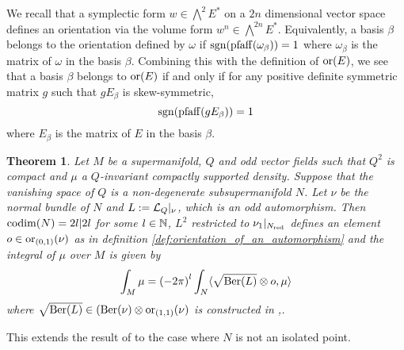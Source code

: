 \documentclass[11pt]{amsart}
\numberwithin{equation}{section}
\numberwithin{figure}{section}
\theoremstyle{plain}
\newtheorem{thm}{Theorem}[subsection]
\theoremstyle{definition}
\theoremstyle{remark}
\begin{document}
We recall that a symplectic form $w\in\bigwedge^{2}E^{*}$ on a $2n$
dimensional vector space defines an orientation via the volume form
$w^{n}\in\bigwedge^{2n}E^{*}$. Equivalently, a basis $\beta$ belongs
to the orientation defined by $\omega$ if $\mathrm{sgn}(\mathrm{pfaff}(\omega_{\beta}))=1$
where $\omega_{\beta}$ is the matrix of $\omega$ in the basis $\beta$.
Combining this with the definition of $\mathrm{or}(E)$, we see that a basis
$\beta$ belongs to $\mathrm{or}(E)$ if and only if for any positive definite
symmetric matrix $g$ such that $gE_{\beta}$ is skew-symmetric, 
\[
\mathrm{sgn}(\mathrm{pfaff}(gE_{\beta}))=1
\]
where $E_{\beta}$ is the matrix of $E$ in the basis $\beta$.
\begin{thm}
\label{thm:localization_formula} Let $M$ be a supermanifold, $Q$
and odd vector fields such that $Q^{2}$ is compact and $\mu$ a $Q$-invariant
compactly supported density. Suppose that the vanishing space of $Q$
is a non-degenerate subsupermanifold $N$. Let $\nu$ be the normal
bundle of $N$ and $L:=\mathcal{L}_{Q}|_{\nu}$, which is an odd automorphism.
Then ${\rm codim}(N)=2l|2l$ for some $l\in\mathbb{N}$, $L^{2}$ restricted
to $\nu_{1}|_{N_{\mathrm{red}}}$ defines an element $o\in\mathrm{or}_{(0,1)}(\nu)$
as in definition \ref{def:orientation_of_an_automorphism} and the
integral of $\mu$ over $M$ is given by 
\[
\int_{M}\mu=\left(-2\pi\right)^{l}\int_{N}\langle\sqrt{\mathrm{Ber}(L)}\otimes o,\mu\rangle
\]
where $\sqrt{\mathrm{Ber}(L)}\in(\mathrm{Ber}(\nu)\otimes\mathrm{or}_{(1,1)}(\nu)$ is constructed
in ,.
\end{thm}
This extends the result of \cite{SuppersymmetryAndLocalization} to
the case where $N$ is not an isolated point. 
\end{document}
